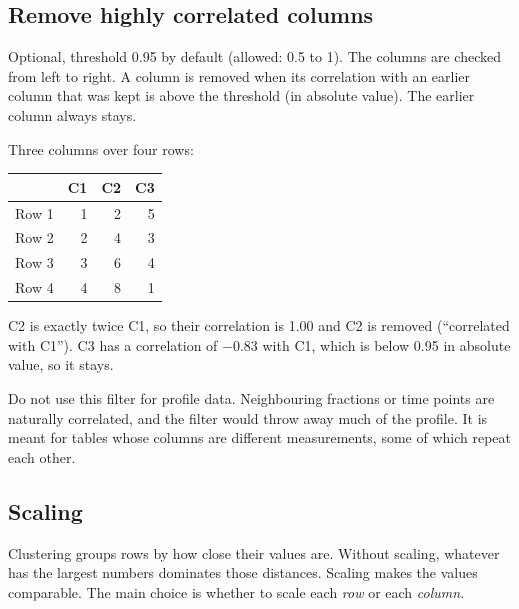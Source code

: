 \documentclass[11pt,a4paper]{article}
\begin{document}
\subsection{Remove highly correlated columns}

Optional, threshold 0.95 by default (allowed: 0.5 to 1). The columns are checked from left to right. A column is
removed when its correlation with an earlier column that was kept is above the threshold (in absolute value). The
earlier column always stays.

\begin{example}
Three columns over four rows:

\begin{center}
\begin{tabular}{lrrr}
\toprule
& C1 & C2 & C3\\
\midrule
Row 1 & 1 & 2 & 5\\
Row 2 & 2 & 4 & 3\\
Row 3 & 3 & 6 & 4\\
Row 4 & 4 & 8 & 1\\
\bottomrule
\end{tabular}
\end{center}

C2 is exactly twice C1, so their correlation is 1.00 and C2 is removed (``correlated with C1''). C3 has a
correlation of $-0.83$ with C1, which is below 0.95 in absolute value, so it stays.
\end{example}

\begin{note}
Do not use this filter for profile data. Neighbouring fractions or time points are naturally correlated, and the
filter would throw away much of the profile. It is meant for tables whose columns are different measurements, some
of which repeat each other.
\end{note}

\subsection{Scaling}

Clustering groups rows by how close their values are. Without scaling, whatever has the largest numbers dominates
those distances. Scaling makes the values comparable. The main choice is whether to scale each \emph{row} or each
\emph{column}.
\end{document}
